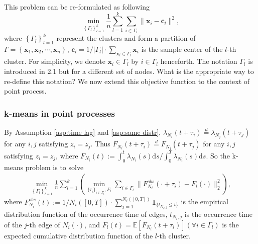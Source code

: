 			
			This problem can be re-formulated as following 
			\begin{equation}\label{eq:kmeans}
			\min_{\left\{ \Gamma_l \right\}_{l=1}^k}\frac{1}{n}\sum_{l=1}^k\sum_{i\in {\Gamma}_l} \|\mathbf{x}_i- \mathbf{c}_l\|^2,
			\end{equation}
			where $\left\{ \Gamma_l \right\}_{l=1}^k$ represent the clusters and form a partition of $\Gamma = \left\{ \mathbf{x}_1,\mathbf{x}_2,\cdots,\mathbf{x}_n \right\}$,
			$\mathbf{c}_l = {1}/{|\Gamma_l|}\cdot\sum_{\mathbf{x}_i\in \Gamma_l}\mathbf{x}_i$ is the sample center of the $l$-th cluster. 
			For simplicity, we denote $\mathbf{x}_i\in \Gamma_l$ by $i\in\Gamma_l$ henceforth.
			{\color{red} The notation $\Gamma_l$ is introduced in 2.1 but for a different set of nodes. What is the appropriate way to re-define this notation?}
			We now extend this objective function to the context of point process.
		
		\subsubsection*{k-means in point processes}
			By Assumption \ref{asp:time lag} and \ref{asp:same distr}, 
			$\lambda_{N_i}(t+\tau_i)\overset{d}{=}\lambda_{N_j}(t+\tau_j)$ for any $i,j$ satisfying $z_i=z_j$. Thus $F_{N_i}(t+\tau_i)\overset{d}{=}F_{N_j}(t+\tau_j)$ for any $i,j$ satisfying $z_i=z_j$, 
			where 
			$F_{N_i}(t):=\int_0^t\lambda_{N_i}(s)\text{d}s\big/\int_0^T\lambda_{N_i}(s)\text{d}s$.
			So the k-means problem is to solve
			\begin{align}\label{eq:kmeans_F}
			\min_{\left\{ \Gamma_l \right\}_{l=1}^k} \frac{1}{n} \sum_{l=1}^k \left(\min_{\{\tau_i\}_{i\in\Gamma_l},F_l} \sum_{i\in\Gamma_l} \| F^{obs}_{N_i}(\cdot+\tau_i)- F_l(\cdot)\|_2^2 \right),
			\end{align}
			where 
			$F^{obs}_{N_i}(t):=1/{N_i([0,T])}\cdot\sum_{j=1}^{N_i([0,T])}\mathbf{1}_{\{t_{N_i,j}\leq t\}}$ is the empirical distribution function of the occurrence time of edges,
			$t_{N_i,j}$ is the occurrence time of the $j$-th edge of $N_i(\cdot)$,
			and $F_l(t)=\mathbb{E}[F_{N_i}(t+\tau_i)] (\forall i\in\Gamma_l)$ is the expected cumulative distribution function of the $l$-th cluster.


